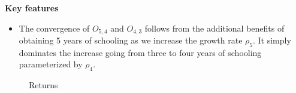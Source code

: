 \begin{frame}\textbf{Key features}\vspace{0.3cm}

\begin{itemize}
\item The convergence of $O_{5, 4}$ and $O_{4, 3}$ follows from the additional benefits of obtaining 5 years of schooling as we increase the growth rate $\rho_5$. It simply dominates the increase going from three to four years of schooling parameterized by $\rho_4$.
\end{itemize}

\end{frame}
\begin{frame}
\begin{figure}[htp]\centering
\caption{Returns}
\end{figure}
\end{frame}
